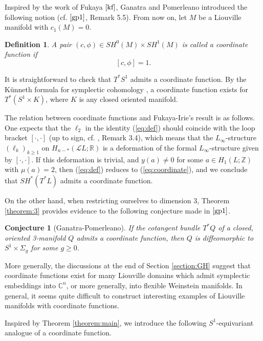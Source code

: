 \documentclass[a4paper]{article}
\newtheorem{definition}[theorem]{Definition}
\newtheorem{conjecture}[theorem]{Conjecture}
\numberwithin{equation}{section}
\begin{document}
Inspired by the work of Fukaya $\cite{kf}$, Ganatra and Pomerleano introduced the following notion (cf. $\cite{gp1}$, Remark 5.5). From now on, let $M$ be a Liouville manifold with $c_1(M)=0$.

\begin{definition}
A pair $(c,\phi)\in\mathit{SH}^0(M)\times\mathit{SH}^1(M)$ is called a coordinate function if
\begin{equation}\label{eq:coordinate}
[c,\phi]=1.
\end{equation}
\end{definition}

It is straightforward to check that $T^\ast S^1$ admits a coordinate function. By the K\"{u}nneth formula for symplectic cohomology \cite{ao}, a coordinate function exists for $T^\ast(S^1\times K)$, where $K$ is any closed oriented manifold.

The relation between coordinate functions and Fukaya-Irie's result is as follows. One expects that the $\ell_2$ in the identity (\ref{eq:def}) should coincide with the loop bracket $[\cdot,\cdot]$ (up to sign, cf. \cite{ki2}, Remark 3.4), which means that the $L_\infty$-structure $(\ell_k)_{k\geq1}$ on $H_{n-\ast}(\mathcal{L}L;\mathbb{R})$ is a deformation of the formal $L_\infty$-structure given by $[\cdot,\cdot]$. If this deformation is trivial, and $y(a)\neq0$ for some $a\in H_1(L;\mathbb{Z})$ with $\mu(a)=2$, then (\ref{eq:def}) reduces to (\ref{eq:coordinate}), and we conclude that $\mathit{SH}^\ast(T^\ast L)$ admits a coordinate function. 

On the other hand, when restricting ourselves to dimension 3, Theorem \ref{theorem:3} provides evidence to the following conjecture made in $\cite{gp1}$.

\begin{conjecture}[Ganatra-Pomerleano]\label{conjecture:GP}
If the cotangent bundle $T^\ast Q$ of a closed, oriented 3-manifold $Q$ admits a coordinate function, then $Q$ is diffeomorphic to $S^1\times\Sigma_g$ for some $g\geq0$.
\end{conjecture}

More generally, the discussions at the end of Section \ref{section:GH} suggest that coordinate functions exist for many Liouville domains which admit symplectic embeddings into $\mathbb{C}^n$, or more generally, into flexible Weinstein manifolds. In general, it seems quite difficult to construct interesting examples of Liouville manifolds with coordinate functions. 

Inspired by Theorem \ref{theorem:main}, we introduce the following $S^1$-equivariant analogue of a coordinate function.
\end{document}
